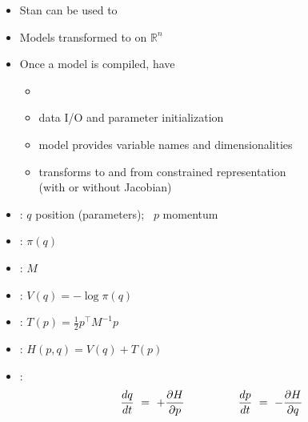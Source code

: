 \documentclass[10pt]{report}
\begin{document}
%
\begin{itemize}
\item Stan can be used to 
\item Models transformed to  on $\mathbb{R}^n$
\item Once a model is compiled, have
  \vspace*{-4pt}
  \begin{itemize}\small
  \item {}
  \item data I/O and parameter initialization
  \item model provides variable names and dimensionalities
  \item transforms to and from constrained representation 
    \\ {\footnotesize (with or without Jacobian)}
  \end{itemize}
\end{itemize}





%
\begin{itemize}
\item {}: $q$ position (parameters); \ $p$ momentum
\item {}: $\pi(q)$
\item {}: $M$
\item {}: $V(q) = -\log \pi(q)$
\item {}: $T(p) = \frac{1}{2} p^{\top} M^{-1} p$
\item {}:  $H(p,q) = V(q) + T(p)$
\item {}:
  \[
  \frac{dq}{dt} \ = \  + \frac{\partial H}{\partial p}
  \hspace*{48pt}
  \frac{dp}{dt} \ = \ - \frac{\partial H}{\partial q}
  \]
\end{itemize}
\end{document}

